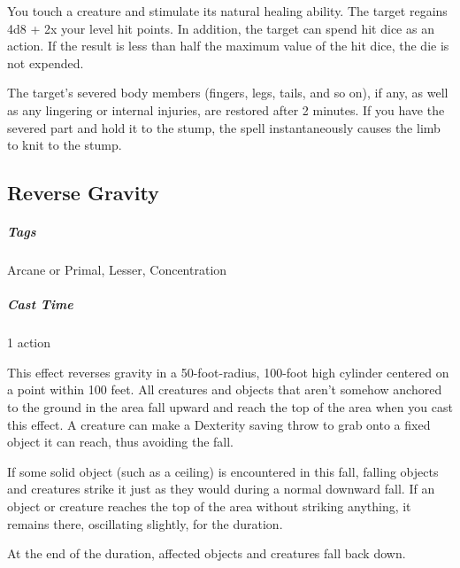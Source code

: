 You touch a creature and stimulate its natural healing ability. The target regains 4d8 + 2x your level hit points. In addition, the target can spend hit dice as an action. If the result is less than half the maximum value of the hit dice, the die is not expended.

The target’s severed body members (fingers, legs, tails, and so on), if any, as well as any lingering or internal injuries, are restored after 2 minutes. If you have the severed part and hold it to the stump, the spell instantaneously causes the limb to knit to the stump.

\subsection{Reverse Gravity}
\subparagraph*{Tags} Arcane or Primal, Lesser, Concentration
\subparagraph*{Cast Time} 1 action

This effect reverses gravity in a 50-foot-radius, 100-foot high cylinder centered on a point within 100 feet. All creatures and objects that aren’t somehow anchored to the ground in the area fall upward and reach the top of the area when you cast this effect. A creature can make a Dexterity saving throw to grab onto a fixed object it can reach, thus avoiding the fall.

If some solid object (such as a ceiling) is encountered in this fall, falling objects and creatures strike it just as they would during a normal downward fall. If an object or creature reaches the top of the area without striking anything, it remains there, oscillating slightly, for the duration.

At the end of the duration, affected objects and creatures fall back down.








